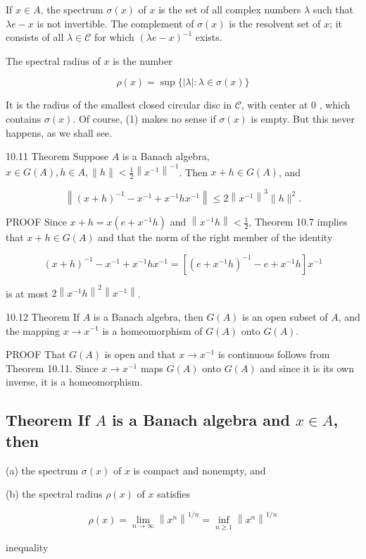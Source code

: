 \documentclass[10pt]{article}
\begin{document}
If $x \in A$, the spectrum $\sigma(x)$ of $x$ is the set of all complex numbers $\lambda$ such that $\lambda e-x$ is not invertible. The complement of $\sigma(x)$ is the resolvent set of $x$; it consists of all $\lambda \in \mathscr{C}$ for which $(\lambda e-x)^{-1}$ exists.

The spectral radius of $x$ is the number

$$
\rho(x)=\sup \{|\lambda|: \lambda \in \sigma(x)\}
$$

It is the radius of the smallest closed circular disc in $\mathscr{C}$, with center at 0 , which contains $\sigma(x)$. Of course, (1) makes no sense if $\sigma(x)$ is empty. But this never happens, as we shall see.

10.11 Theorem Suppose $A$ is a Banach algebra, $x \in G(A), h \in A,\|h\|<\frac{1}{2}\left\|x^{-1}\right\|^{-1}$.
Then $x+h \in G(A)$, and

$$
\left\|(x+h)^{-1}-x^{-1}+x^{-1} h x^{-1}\right\| \leq 2\left\|x^{-1}\right\|^{3}\|h\|^{2} .
$$

PROOF Since $x+h=x\left(e+x^{-1} h\right)$ and $\left\|x^{-1} h\right\|<\frac{1}{2}$, Theorem 10.7 implies that $x+h \in G(A)$ and that the norm of the right member of the identity

$$
(x+h)^{-1}-x^{-1}+x^{-1} h x^{-1}=\left[\left(e+x^{-1} h\right)^{-1}-e+x^{-1} h\right] x^{-1}
$$

is at most $2\left\|x^{-1} h\right\|^{2}\left\|x^{-1}\right\|$.

10.12 Theorem If $A$ is a Banach algebra, then $G(A)$ is an open subset of $A$, and the mapping $x \rightarrow x^{-1}$ is a homeomorphism of $G(A)$ onto $G(A)$.

PROOF That $G(A)$ is open and that $x \rightarrow x^{-1}$ is continuous follows from Theorem 10.11. Since $x \rightarrow x^{-1}$ maps $G(A)$ onto $G(A)$ and since it is its own inverse, it is a homeomorphism.

\subsection{Theorem If $A$ is a Banach algebra and $x \in A$, then}
(a) the spectrum $\sigma(x)$ of $x$ is compact and nonempty, and

(b) the spectral radius $\rho(x)$ of $x$ satisfies

$$
\rho(x)=\lim _{n \rightarrow \infty}\left\|x^{n}\right\|^{1 / n}=\inf _{n \geq 1}\left\|x^{n}\right\|^{1 / n}
$$

inequality
\end{document}
